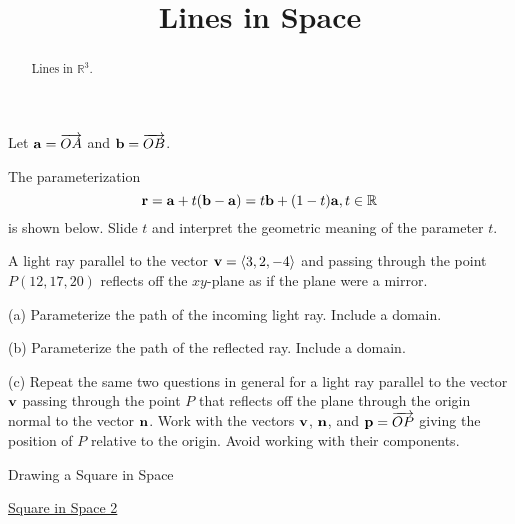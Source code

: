 \documentclass{ximera}
\title{Lines in Space}
\begin{document}
\begin{abstract}
Lines in $\mathbb{R}^3$.
\end{abstract}
\maketitle


\begin{exploration}   \label{Exsd67g:Line}
Let ${\bf a} = \overrightarrow{OA}$ and  ${\bf b} = \overrightarrow{OB}$.

The parameterization 
\[
    {\bf r} = {\bf a} + t({\bf b} - {\bf a}) = t{\bf b} + (1-t){\bf a} , t\in \mathbb{R}
\]
is shown below. Slide $t$ and interpret the geometric meaning of the parameter $t$.

 
\begin{onlineOnly}
    \begin{center}
\end{center}
\end{onlineOnly}

\end{exploration}


\begin{question}  \label{Qdr5577:Lines}
A light ray parallel to the vector ${\bf v} = \langle 3,2,-4 \rangle$ and passing through the point $P(12, 17,20)$ reflects off the $xy$-plane as if the plane were a mirror.

(a) Parameterize the path of the incoming light ray. Include a domain.

(b) Parameterize the path of the reflected ray. Include a domain.

(c) Repeat the same two questions in general for a light ray parallel to the vector ${\bf v}$ passing through the point $P$ that reflects off the plane through the origin normal to the vector ${\bf n}$. Work with the vectors ${\bf v}$, ${\bf n}$, and ${\bf p} = \overrightarrow{OP}$ giving the position of $P$ relative to the origin. Avoid working with their components. 
\end{question}



Drawing a Square in Space

\href{https://www.desmos.com/3d/3a19b63ef0}{Square in Space 2}
\end{document}
